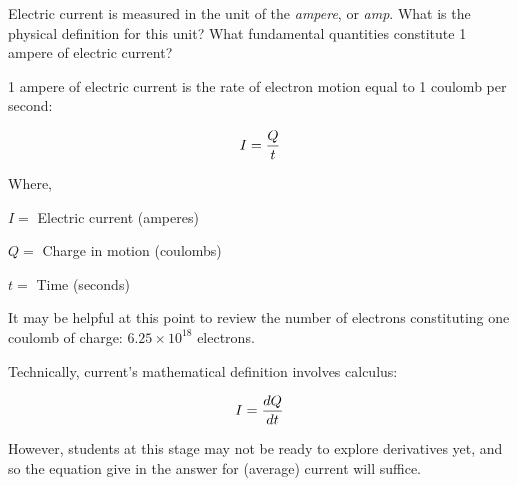 

Electric current is measured in the unit of the {\it ampere}, or {\it amp}.  What is the physical definition for this unit?  What fundamental quantities constitute 1 ampere of electric current?







1 ampere of electric current is the rate of electron motion equal to 1 coulomb per second:

$$I = {Q \over t}$$

\noindent
Where,

$I =$ Electric current (amperes)

$Q =$ Charge in motion (coulombs)

$t =$ Time (seconds)







It may be helpful at this point to review the number of electrons constituting one coulomb of charge: $6.25 \times 10^{18}$ electrons.

Technically, current's mathematical definition involves calculus:

$$I = {dQ \over dt}$$

However, students at this stage may not be ready to explore derivatives yet, and so the equation give in the answer for (average) current will suffice.




